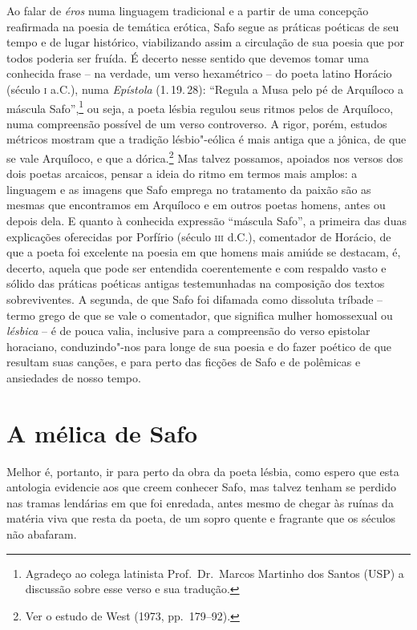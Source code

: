 Ao falar de \textit{éros} numa linguagem tradicional e a partir de uma concepção
reafirmada na poesia de temática erótica, Safo segue as práticas poéticas de
seu tempo e de lugar histórico, viabilizando assim a circulação de sua poesia
que por todos poderia ser fruída. É decerto nesse sentido que
devemos tomar uma conhecida frase -- na verdade, um verso hexamétrico -- do poeta
latino Horácio (século \textsc{i} a.C.), numa \textit{Epístola} (1.\,19.\,28):
``Regula a Musa pelo pé de Arquíloco a máscula Safo”,\footnote{ Agradeço
ao colega latinista Prof.~Dr.~Marcos Martinho dos Santos (\textsc{USP}) a discussão sobre esse verso e
sua tradução.} ou seja, a poeta lésbia regulou seus ritmos pelos de Arquíloco,
numa compreensão possível de um verso controverso. A rigor, porém,
estudos métricos mostram que a tradição lésbio"-eólica é mais antiga que a
jônica, de que se vale Arquíloco, e que a dórica.\footnote{ Ver o estudo de West
(1973, pp.~179--92).} Mas talvez possamos, apoiados nos versos dos dois poetas
arcaicos, pensar a ideia do ritmo em termos mais amplos: a linguagem e
as imagens que Safo emprega no tratamento da paixão são as mesmas que
encontramos em Arquíloco e em outros poetas homens, antes ou depois dela. E
quanto à conhecida expressão ``máscula Safo”, a primeira das duas
explicações oferecidas por Porfírio (século \textsc{iii} d.C.), comentador de Horácio,
de que a poeta foi excelente na poesia em que homens mais amiúde se
destacam, é, decerto, aquela que pode ser entendida coerentemente e com
respaldo vasto e sólido das práticas poéticas antigas testemunhadas na
composição dos textos sobreviventes. A segunda, de que Safo foi difamada como
dissoluta tríbade -- termo grego de que se vale o comentador, que significa
mulher homossexual ou \textit{lésbica} -- é de pouca valia, inclusive para a
compreensão do verso epistolar horaciano, conduzindo"-nos para longe de sua
poesia e do fazer poético de que resultam suas canções, e para perto das
ficções de Safo e de polêmicas e ansiedades de nosso tempo. 


\section*{A mélica de Safo}

Melhor é, portanto, ir para perto da obra da poeta lésbia, como espero que esta
antologia evidencie aos que creem conhecer Safo, mas talvez tenham se perdido
nas tramas lendárias em que foi enredada, antes mesmo de chegar às ruínas da
matéria viva que resta da poeta, de um sopro quente e fragrante que os séculos
não abafaram.

